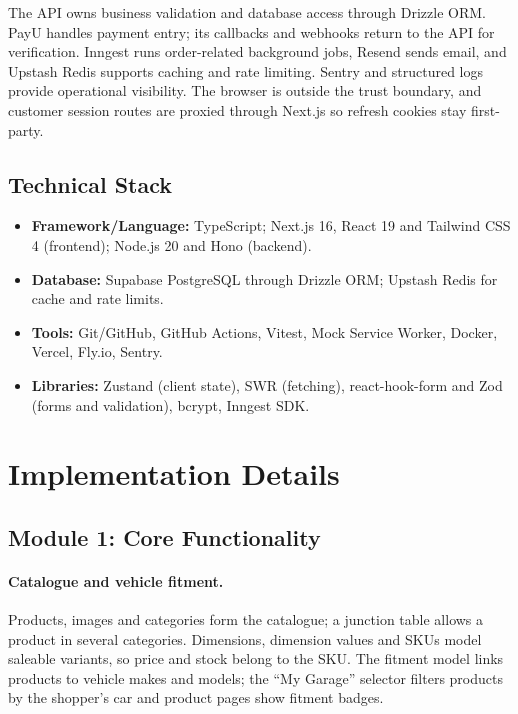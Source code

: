 \documentclass{tietreport}
\begin{document}
The API owns business validation and database access through Drizzle ORM.
PayU handles payment entry; its callbacks and webhooks return to the API for
verification. Inngest runs order-related background jobs, Resend sends
email, and Upstash Redis supports caching and rate limiting. Sentry and
structured logs provide operational visibility. The browser is outside the
trust boundary, and customer session routes are proxied through Next.js so
refresh cookies stay first-party.

\subsection{Technical Stack}

\begin{itemize}
  \item \textbf{Framework/Language:} TypeScript; Next.js 16, React 19 and
        Tailwind CSS 4 (frontend); Node.js 20 and Hono (backend).
  \item \textbf{Database:} Supabase PostgreSQL through Drizzle ORM; Upstash
        Redis for cache and rate limits.
  \item \textbf{Tools:} Git/GitHub, GitHub Actions, Vitest, Mock Service
        Worker, Docker, Vercel, Fly.io, Sentry.
  \item \textbf{Libraries:} Zustand (client state), SWR (fetching),
        react-hook-form and Zod (forms and validation), bcrypt, Inngest SDK.
\end{itemize}

\section{Implementation Details}

\subsection{Module 1: Core Functionality}

\paragraph{Catalogue and vehicle fitment.}
Products, images and categories form the catalogue; a junction table allows a
product in several categories. Dimensions, dimension values and SKUs model
saleable variants, so price and stock belong to the SKU. The fitment model
links products to vehicle makes and models; the ``My Garage'' selector
filters products by the shopper's car and product pages show fitment badges.
\end{document}
